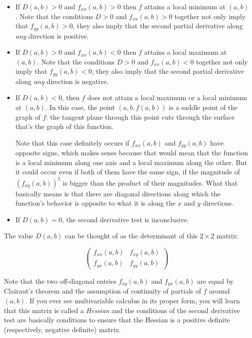 \documentclass[10pt]{amsart}
\begin{document}
\begin{itemize}
\item If $D(a,b) > 0$ and $f_{xx}(a,b) > 0$ then $f$ attains a local
  minimum at $(a,b)$. Note that the conditions $D > 0$ and
  $f_{xx}(a,b) > 0$ together not only imply that $f_{yy}(a,b) > 0$,
  they also imply that the second partial derivative along {\em any}
  direction is positive.
\item If $D(a,b) > 0$ and $f_{xx}(a,b) < 0$ then $f$ attains a local
  maximum at $(a,b)$. Note that the conditions $D > 0$ and
  $f_{xx}(a,b) < 0$ together not only imply that $f_{yy}(a,b) < 0$,
  they also imply that the second partial derivative along {\em any}
  direction is negative.
\item If $D(a,b) < 0$, then $f$ does not attain a local maximum or a
  local minimum at $(a,b)$. In this case, the point $(a,b,f(a,b))$ is
  a saddle point of the graph of $f$: the tangent plane through this
  point cuts through the surface that's the graph of this function.

  Note that this case definitely occurs if $f_{xx}(a,b)$ and
  $f_{yy}(a,b)$ have opposite signs, which makes sense because that
  would mean that the function is a local minimum along one axis and a
  local maximum along the other. But it could occur even if both of
  them have the same sign, if the magnitude of $(f_{xy}(a,b))^2$ is
  bigger than the product of their magnitudes. What that basically
  means is that there are diagonal directions along which the
  function's behavior is opposite to what it is along the $x$ and $y$
  directions.
\item If $D(a,b) = 0$, the second derivative test is inconclusive.
\end{itemize}

The value $D(a,b)$ can be thought of as the determinant of this $2
\times 2$ matrix:

$$\left(\begin{array}{ll}f_{xx}(a,b) & f_{xy}(a,b) \\ f_{yx}(a,b) & f_{yy}(a,b) \end{array}\right)$$

Note that the two off-diagonal entries $f_{xy}(a,b)$ and $f_{yx}(a,b)$
are equal by Clairaut's theorem and the assumption of continuity of
partials of $f$ around $(a,b)$. If you ever see multivariable calculus
in its proper form, you will learn that this matrix is called a {\em
Hessian} and the conditions of the second derivative test are
basically conditions to ensure that the Hessian is a positive definite
(respectively, negative definite) matrix.
\end{document}
